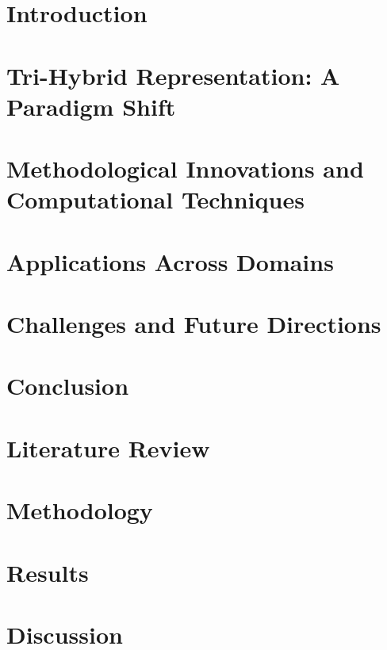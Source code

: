 \documentclass[10pt,journal,compsoc]{IEEEtran}
\begin{document}
\section{Introduction}


\section{Tri-Hybrid Representation: A Paradigm Shift}


\section{Methodological Innovations and Computational Techniques}


\section{Applications Across Domains}


\section{Challenges and Future Directions}


\section{Conclusion}


\section{Literature Review}


\section{Methodology}


\section{Results}


\section{Discussion}




\end{document}
